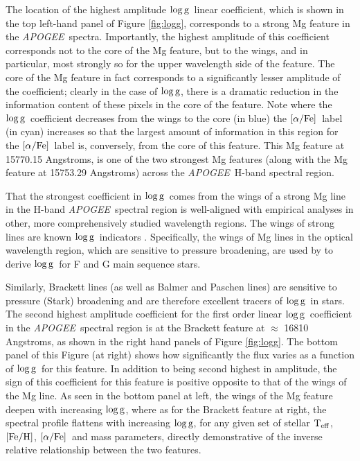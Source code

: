 \documentclass[12pt, preprint]{aastex}
\newcommand{\project}[1]{\textsl{#1}}
\newcommand{\apogee}{\project{APOGEE}}
\newcommand{\teff}{\mbox{$\rm T_{eff}$}}
\newcommand{\feh}{\mbox{$\rm [Fe/H]$}}
\newcommand{\alphafe}{\mbox{$\rm [\alpha/Fe]$}}
\newcommand{\logg}{\mbox{$\rm \log g$}}
\begin{document}
The location of the highest amplitude \logg\ linear coefficient, which is shown in the top left-hand panel of Figure \ref{fig:logg}, corresponds to a strong  Mg feature in the \apogee\ spectra. Importantly, the highest amplitude of this coefficient corresponds not to the core of the Mg feature, but to the wings, and in particular, most strongly so for the upper wavelength side of the feature. The core of the Mg feature in fact  corresponds to a significantly lesser amplitude of  the coefficient; clearly in the case of \logg,  there is a dramatic reduction in the information content of these pixels in the core of the feature. Note where the \logg\ coefficient decreases from the wings to the core (in blue) the \alphafe\ label (in cyan) increases so that the largest amount of information in this region for the \alphafe\ label is, conversely, from the core of this feature. This Mg feature at 15770.15 Angstroms, is one of the two strongest Mg features (along with the Mg feature at 15753.29 Angstroms) across the \apogee\ H-band spectral region. 

That the strongest coefficient in \logg\ comes from the wings of a strong Mg line in the H-band \apogee\ spectral region is well-aligned with empirical analyses in other, more comprehensively studied wavelength regions. The wings of strong lines are known \logg\ indicators \citep{Gray2008}. Specifically, the wings of Mg lines in the optical wavelength region, which are sensitive to pressure broadening, are used by \citet{F1997} to derive \logg\ for F and G main sequence stars.  

Similarly, Brackett lines (as well as Balmer and Paschen lines)  are sensitive to pressure (Stark) broadening and are therefore excellent tracers of \logg\ in stars. The second highest amplitude coefficient for the first order linear \logg\ coefficient in the \apogee\ spectral region is at the Brackett feature  at $\approx$ 16810 Angstroms, as shown in the right hand panels of Figure \ref{fig:logg}. The  bottom panel of this Figure (at right) shows how significantly the flux varies as a function of \logg\ for this feature. In addition to being second highest in amplitude, the sign of this coefficient for this feature is positive opposite to that  of the wings of the Mg line. As seen in the bottom panel at left, the wings of the Mg feature deepen with increasing \logg, where as for the Brackett feature at right, the spectral profile flattens with increasing \logg, for any given set of stellar \teff, \feh, \alphafe\ and mass parameters, directly demonstrative of the inverse relative relationship between the two features. 
\end{document}
